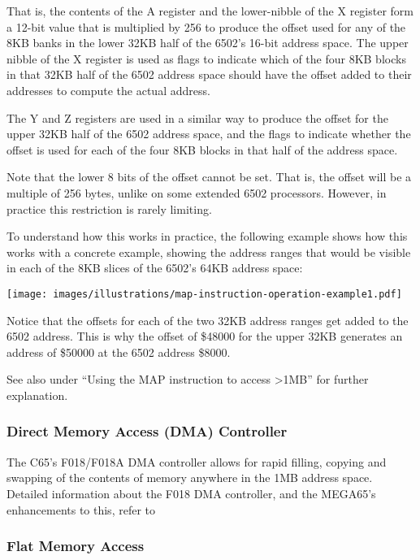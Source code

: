 That is, the contents of the A register and the lower-nibble of the X register form a 12-bit value
that is multiplied by 256 to produce the offset used for any of the 8KB banks in the lower 32KB half of the 6502's 16-bit address
space.  The upper nibble of the X register is used as flags to indicate which of the four 8KB blocks in that 32KB half of the
6502 address space should have the offset added to their addresses to compute the actual address.

The Y and Z registers are used in a similar way to produce the offset for the upper 32KB half of the 6502 address space, and the
flags to indicate whether the offset is used for each of the four 8KB blocks in that half of the address space.

Note that the lower 8 bits of the offset cannot be set. That is, the offset will be a multiple of 256
bytes, unlike on some extended 6502 processors.  However, in practice this restriction is rarely
limiting.

To understand how this works in practice, the following example shows how this works with a concrete
example, showing the address ranges that would be visible in each of the 8KB slices of the 6502's
64KB address space:

\begin{center}
  \texttt{[image: images/illustrations/map-instruction-operation-example1.pdf]}
\end{center}

Notice that the offsets for each of the two 32KB address ranges get added to the 6502 address.
This is why the offset of \$48000 for the upper 32KB generates an address of \$50000 at the 6502
address \$8000.

See also under ``Using the MAP instruction to access >1MB'' for further explanation.

\subsubsection{Direct Memory Access (DMA) Controller}

The C65's F018/F018A DMA controller allows for rapid filling, copying and swapping of the contents of memory
anywhere in the 1MB address space. Detailed information about the F018 DMA controller, and the MEGA65's
enhancements to this, refer to 

\subsubsection{Flat Memory Access}

